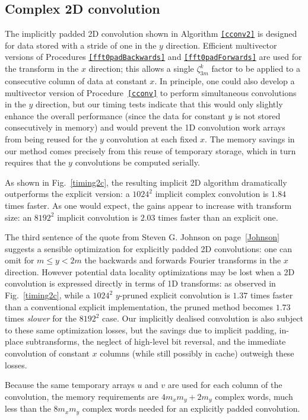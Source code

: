 \documentclass[final]{siamltex}
\begin{document}
\subsection{Complex 2D convolution}
The implicitly padded 2D convolution shown in Algorithm {\tt\ref{cconv2}} 
is designed for data stored with a stride of one in the $y$
direction. Efficient multivector versions of Procedures {\tt\ref{fft0padBackwards}}
and {\tt\ref{fft0padForwards}} are used for the transform in the $x$ direction;
this allows a single $\zeta_{3m}^k$ factor to be applied to a consecutive
column of data at constant $x$. In principle, one could also develop a
multivector version of Procedure~{\tt\ref{cconv}} to perform simultaneous
convolutions in the $y$ direction, but our timing tests indicate that this
would only slightly enhance the overall performance (since the data for constant
$y$ is not stored consecutively in memory) and would prevent the 1D convolution
work arrays from being reused for the $y$ convolution at each fixed $x$. The
memory savings in our method comes precisely from this reuse of temporary
storage, which in turn requires that the $y$ convolutions be computed
serially.

As shown in Fig.~\ref{timing2c}, the resulting implicit
2D algorithm dramatically outperforms the explicit version:
a $1024^2$ implicit complex convolution is $1.84$ times faster.
As one would expect, the gains appear to increase with transform size: an
$8192^2$ implicit convolution is $2.03$ times faster than an explicit one. 

The third sentence of the quote from Steven G. Johnson on
page~\ref{Johnson} suggests a sensible optimization for
explicitly padded 2D convolutions: one can omit for $m \le y < 2m$
the backwards and forwards Fourier transforms in the $x$ direction.
However potential data locality optimizations may be lost
when a 2D convolution is expressed directly in terms of 1D transforms: as
observed in Fig.~\ref{timing2c}, while a $1024^2$ $y$-pruned explicit
convolution is $1.37$ times faster than a conventional explicit
implementation, the pruned method becomes $1.73$ times {\it slower} for the
$8192^2$ case. Our implicitly dealised convolution is also subject
to these same optimization losses, but the savings due to implicit padding,
in-place subtransforms, the neglect of high-level bit reversal, and the
immediate convolution of constant $x$ columns (while still possibly in
cache) outweigh these losses.

Because the same temporary arrays $u$ and $v$ are used for each column
of the convolution, the memory requirements are $4m_xm_y+2m_y$ complex
words, much less than the $8m_xm_y$ complex words needed for an
explicitly padded convolution.
\end{document}
